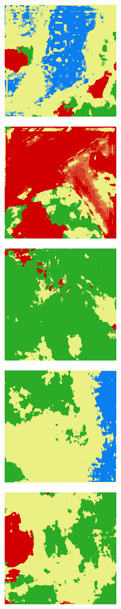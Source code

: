 \begin{figure}[h]
\begin{subfigure}{\DensenetPredictionsImageWidth}
        \caption{}
        \label{fig:densenet_pred_label}
    \end{subfigure} \hspace{1mm}
    \begin{subfigure}{\DensenetPredictionsImageWidth}
        \includegraphics[width=\textwidth]{images/densenet/56d}

\end{subfigure}
\end{figure}
